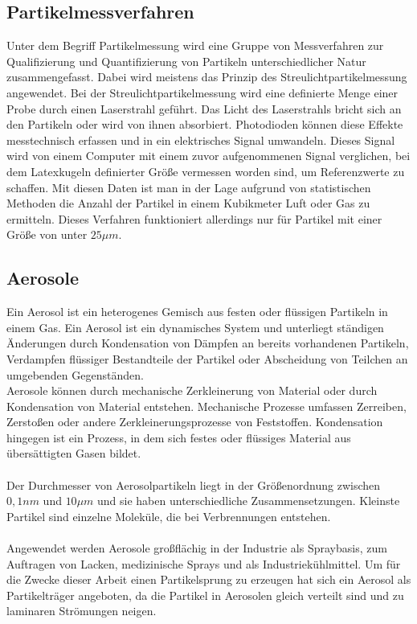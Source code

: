 \subsection{Partikelmessverfahren}
Unter dem Begriff Partikelmessung wird eine Gruppe von Messverfahren zur Qualifizierung und Quantifizierung von Partikeln unterschiedlicher Natur zusammengefasst. Dabei wird meistens das Prinzip des Streulichtpartikelmessung angewendet. Bei der Streulichtpartikelmessung wird eine definierte Menge einer Probe durch einen Laserstrahl gef\"{u}hrt. Das Licht des Laserstrahls bricht sich an den Partikeln oder wird von ihnen absorbiert. Photodioden k\"{o}nnen diese Effekte messtechnisch erfassen und in ein elektrisches Signal umwandeln. Dieses Signal wird von einem Computer mit einem zuvor aufgenommenen Signal verglichen, bei dem Latexkugeln definierter Gr\"{o}{\ss}e vermessen worden sind, um Referenzwerte zu schaffen. Mit diesen Daten ist man in der Lage aufgrund von statistischen Methoden die Anzahl der Partikel in einem Kubikmeter Luft oder Gas zu ermitteln. Dieses Verfahren funktioniert allerdings nur f\"{u}r Partikel mit einer Gr\"{o}{\ss}e von unter \(25 \mu m\)\cite{reinraumtechnik}.

\subsection{Aerosole}
Ein Aerosol ist ein heterogenes Gemisch aus festen oder fl\"{u}ssigen Partikeln in einem Gas. Ein Aerosol ist ein dynamisches System und unterliegt st\"{a}ndigen \"{A}nderungen durch Kondensation von D\"{a}mpfen an bereits vorhandenen Partikeln, Verdampfen fl\"{u}ssiger Bestandteile der Partikel oder Abscheidung von Teilchen an umgebenden Gegenst\"{a}nden.\\
Aerosole k\"{o}nnen durch mechanische Zerkleinerung von Material oder durch Kondensation von Material entstehen. Mechanische Prozesse umfassen Zerreiben, Zerstoßen oder andere Zerkleinerungsprozesse von Feststoffen. Kondensation hingegen ist ein Prozess, in dem sich festes oder fl\"{u}ssiges Material aus \"{u}bers\"{a}ttigten Gasen bildet.
\\\\
Der Durchmesser von Aerosolpartikeln liegt in der Gr\"{o}{\ss}enordnung zwischen \(0,1 nm\) und \(10 \mu m\) und sie haben unterschiedliche Zusammensetzungen. Kleinste Partikel sind einzelne Molek\"{u}le, die bei Verbrennungen entstehen.
\\\\
Angewendet werden Aerosole gro{\ss}fl\"{a}chig in der Industrie als Spraybasis, zum Auftragen von Lacken, medizinische Sprays und als Industriek\"{u}hlmittel. Um f\"{u}r die Zwecke dieser Arbeit einen Partikelsprung zu erzeugen hat sich ein Aerosol als Partikeltr\"{a}ger angeboten, da die Partikel in Aerosolen gleich verteilt sind und zu laminaren Str\"{o}mungen neigen\cite{aerosole}.